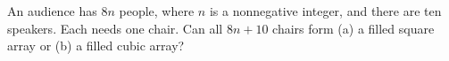 An audience has $8n$ people, where $n$ is a nonnegative integer, and there are ten speakers. Each needs one chair. Can all $8n+10$ chairs form (a) a filled square array or (b) a filled cubic array?
